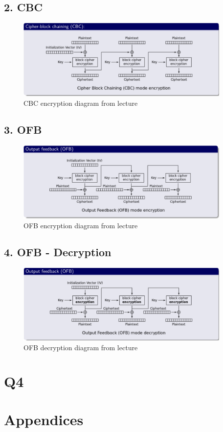 \documentclass{article}
\begin{document}
\subsection{2. CBC}
\begin{figure}[H]
 \centering
  \includegraphics[width=300pt]{img/cbcLecture.png}
 \caption{CBC encryption diagram from lecture}
 \end{figure}
\subsection{3. OFB}
\begin{figure}[H]
 \centering
  \includegraphics[width=300pt]{img/ofbEnLecture.png}
 \caption{OFB encryption diagram from lecture}
 \end{figure}
\subsection{4. OFB - Decryption}
\begin{figure}[H]
 \centering
  \includegraphics[width=300pt]{img/ofbDeLecture.png}
 \caption{OFB decryption diagram from lecture}
 \end{figure}


\section{Q4}




\section{Appendices}


\newpage

\nocite{*}



\end{document}

